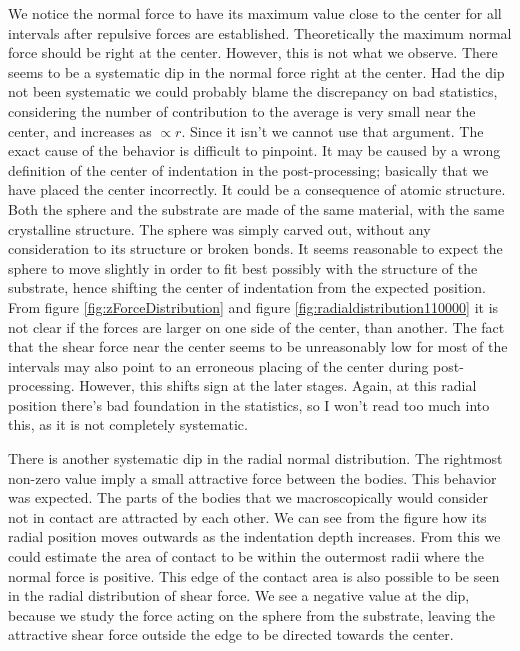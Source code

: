 \documentclass[twoside,english]{uiofysmaster}
\begin{document}
 We notice the normal force to have its maximum value close to the center for all intervals after repulsive forces are established. 
 Theoretically the maximum normal force should be right at the center. 
 However, this is not what we observe. 
 There seems to be a systematic dip in the normal force right at the center. 
 Had the dip not been systematic we could probably blame the discrepancy on bad statistics, considering the number of contribution to the average is very small near the center, and increases as $\propto r$. 
 Since it isn't we cannot use that argument. 
 The exact cause of the behavior is difficult to pinpoint. 
 It may be caused by a wrong definition of the center of indentation in the post-processing; basically that we have placed the center incorrectly. 
 It could be a 	consequence of atomic structure. 
 Both the sphere and the substrate are made of the same material, with the same crystalline structure. 
 The sphere was simply carved out, without any consideration to its structure or broken bonds. 
 It seems reasonable to expect the sphere to move slightly in order to fit best possibly with the structure of the substrate, hence shifting the center of indentation from the expected position. 
 From figure \ref{fig:zForceDistribution} and figure \ref{fig:radialdistribution110000} it is not clear if the forces are larger on one side of the center, than another. 
 The fact that the shear force near the center seems to be unreasonably low for most of the intervals may also point to an erroneous placing of the center during post-processing.
 However, this shifts sign at the later stages. 
 Again, at this radial position there's bad foundation in the statistics, so I won't read too much into this, as it is not completely systematic. 
 
 There is another systematic dip in the radial normal distribution. 
 The rightmost non-zero value imply a small attractive force between the bodies. 
 This behavior was expected. 
 The parts of the  bodies that we macroscopically would consider not in contact are attracted by each other. 
 We can see from the figure how its radial position moves outwards as the indentation depth increases.
 From this we could estimate the area of contact to be within the  outermost radii where the normal force is positive.  
 This edge of the contact area is also possible to be seen in the radial distribution of shear force. 
 We see a negative value at the dip, because we study the force acting on the sphere from the substrate, leaving the attractive shear force outside the edge to be directed towards the center. 
  
\end{document}
